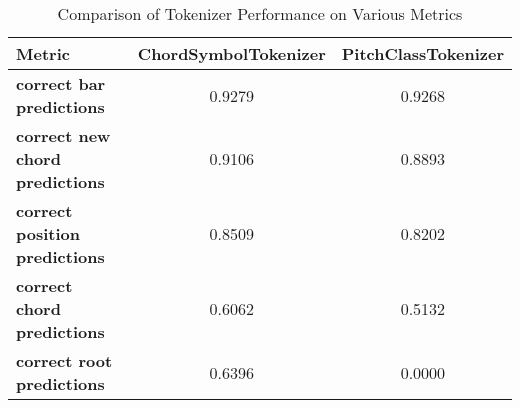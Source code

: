 
    \begin{table}[h]
        \centering
        \renewcommand{\arraystretch}{1.2}
        \begin{tabular}{lcc}
            \hline
            \textbf{Metric} & \textbf{ChordSymbolTokenizer} & \textbf{PitchClassTokenizer} \\
            \hline
            \textbf{correct bar predictions} & 0.9279 & 0.9268 \\
        \textbf{correct new chord predictions} & 0.9106 & 0.8893 \\
        \textbf{correct position predictions} & 0.8509 & 0.8202 \\
        \textbf{correct chord predictions} & 0.6062 & 0.5132 \\
        \textbf{correct root predictions} & 0.6396 & 0.0000 \\
        \hline
        \end{tabular}
        \caption{Comparison of Tokenizer Performance on Various Metrics}
        \label{tab:tokenizer_performance}
    \end{table}
    
